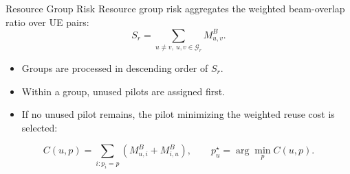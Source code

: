 \documentclass[10pt,aspectratio=169]{beamer}
\newenvironment{tightitemize}{%
    \begin{itemize}
        \setlength{\itemsep}{2pt}
        \setlength{\parskip}{0pt}
        \setlength{\parsep}{0pt}
}{%
    \end{itemize}
}
\begin{document}
\begin{frame}{Resource Group Risk}
    \small
    Resource group risk aggregates the weighted beam-overlap ratio over UE pairs:
    \[
        S_r
        =
        \sum_{u\neq v,\ u,v\in\mathcal{G}_r}
        M_{u,v}^{B}.
    \]

    \vspace{0.5em}
    \begin{tightitemize}
        \item Groups are processed in descending order of \(S_r\).
        \item Within a group, unused pilots are assigned first.
        \item If no unused pilot remains, the pilot minimizing the weighted reuse cost is selected:
    \end{tightitemize}

    \vspace{0.4em}
    \[
        C(u,p)
        =
        \sum_{i:p_i=p}
        \left(M_{u,i}^{B}+M_{i,u}^{B}\right),
        \qquad
        p_u^{\star}=\arg\min_{p} C(u,p).
    \]
\end{frame}
\end{document}
